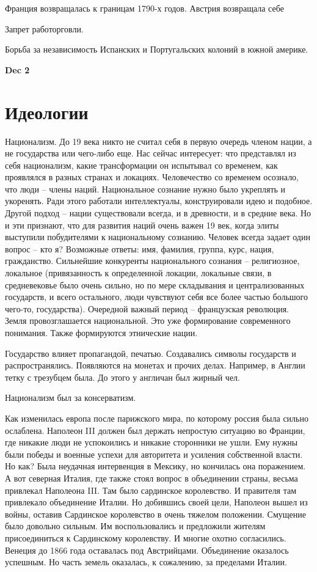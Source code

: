 \documentclass[a4paper, 12pt]{article}
\def\dateis#1{\vspace{\baselineskip}\hfill\textbf{#1}\par}
\begin{document}
\begin{multicols}{2}
Франция возвращалась к границам 1790-х годов. Австрия возвращала себе 

Запрет работорговли. 

Борьба за независимость Испанских и Португальских колоний в южной америке. 

\dateis{Dec 2}

\section{Идеологии}

Национализм. До 19 века никто не считал себя в первую очередь членом нации, а не государства или чего-либо еще. Нас сейчас интересует: что представлял из себя национализм, какие трансформации он испытывал со временем, как проявлялся в разных странах и локациях. Человечество со временем осознало, что люди -- члены наций. Национальное сознание нужно было укреплять и укоренять. Ради этого работали интеллектуалы, конструировали идею и подобное. Другой подход -- нации существовали всегда, и в древности, и в средние века. Но и эти признают, что для развития наций очень важен 19 век, когда элиты выступили побудителями к национальному сознанию. Человек всегда задает один вопрос -- кто я? Возможные ответы: имя, фамилия, группа, курс, нация, гражданство. Сильнейшие конкуренты национального сознания -- религиозное, локальное (привязанность к определенной локации, локальные связи, в средневековье было очень сильно, но по мере складывания и централизованных государств, и всего остального, люди чувствуют себя все более частью большого чего-то, государства). Очередной важный период -- французская революция. Земля провозглашается национальной. Это уже формирование современного понимания. Также формируются этнические нации. 

Государство влияет пропагандой, печатью. Создавались символы государств и распространялись. Появляются на монетах и прочих делах. Например, в Англии тетку с трезубцем была. До этого у англичан был жирный чел.

Национализм был за консерватизм. 

Как изменилась европа после парижского мира, по которому россия была сильно ослаблена. Наполеон III должен был держать непростую ситуацию во Франции, где никакие люди не успокоились и никакие сторонники не ушли. Ему нужны были победы и военные успехи для авторитета и усиления собственной власти. Но как? Была неудачная интервенция в Мексику, но кончилась она поражением. А вот северная Италия, где также стоял вопрос в объединении страны, весьма привлекал Наполеона III. Там было сардинское королевство. И правителя там привлекало объединение Италии. Но добившись своей цели, Наполеон вышел из войны, оставив Сардинское королевство в очень тяжелом положении. Смущение было довольно сильным. Им воспользовались и предложили жителям присоединиться к Сардинскому королевству. И многие охотно согласились. Венеция до 1866 года оставалась под Австрийцами. Объединение оказалось успешным. Но часть земель оказалась, к сожалению, за пределами Италии. 


\end{multicols}
\end{document}
